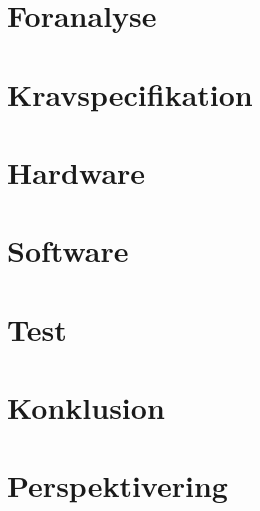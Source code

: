 



\renewcommand\chaptername{Kapitel}
\renewcommand\contentsname{Indholdsfortegnelse}
\renewcommand\figurename{Figur}
\renewcommand\tablename{Tabel} 


\cleardoublepage

\frontmatter




\cleardoublepage

\tableofcontents*
\newpage
\printnomenclature
\renewcommand*\listfigurename{Figurliste}
\renewcommand*\listtablename{Tabelliste}

\mainmatter
\chapter{Foranalyse}



\chapter{Kravspecifikation}


\chapter{Hardware}


\chapter{Software}


\chapter{Test}


\chapter{Konklusion}


\chapter{Perspektivering}

\newpage
\printbibliography
\newpage
\listoffixmes

